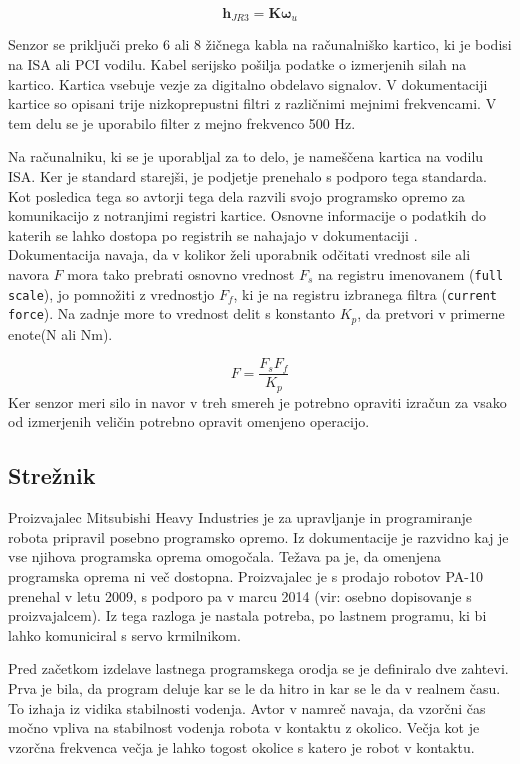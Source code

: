 \documentclass[a4paper]{article}
\begin{document}
\begin{equation}
\textbf{h}_{JR3} = \textbf{K} \mathbf{\omega}_u
\end{equation}



Senzor se priključi preko 6 ali 8 žičnega kabla na računalniško kartico, ki je bodisi na ISA ali PCI vodilu. Kabel serijsko pošilja podatke o izmerjenih silah na kartico. Kartica vsebuje vezje za digitalno obdelavo signalov. V dokumentaciji kartice \cite{jr3_doc_inst} so opisani trije nizkoprepustni filtri z različnimi mejnimi frekvencami. V tem delu se je uporabilo filter z mejno frekvenco 500 Hz.

Na računalniku, ki se je uporabljal za to delo, je nameščena kartica na vodilu ISA. Ker je standard starejši, je podjetje prenehalo s podporo tega standarda. Kot posledica tega so avtorji tega dela razvili svojo programsko opremo za komunikacijo z notranjimi registri kartice. Osnovne informacije o podatkih do katerih se lahko dostopa po registrih se nahajajo v dokumentaciji \cite{jr3_doc_inst}.
Dokumentacija navaja, da v kolikor želi uporabnik odčitati vrednost sile ali navora $F$ mora tako prebrati osnovno vrednost $F_s$ na registru imenovanem (\verb|full scale|), jo pomnožiti z vrednostjo $F_f$, ki je na registru izbranega filtra (\verb|current force|). Na zadnje more to vrednost delit s konstanto $K_p$, da pretvori v primerne enote(N ali Nm).

\begin{equation}\label{eq:force_filt}
F = \frac{F_s  F_f}{K_p}
\end{equation}
Ker senzor meri silo in navor v treh smereh je potrebno opraviti izračun za vsako od izmerjenih veličin potrebno opravit omenjeno operacijo.

\subsection{Strežnik} \label{sec:streznik}

Proizvajalec Mitsubishi Heavy Industries je za upravljanje in programiranje robota pripravil posebno programsko opremo. Iz dokumentacije je razvidno kaj je vse njihova programska oprema omogočala. Težava pa je, da omenjena programska oprema ni več dostopna. Proizvajalec je s prodajo robotov PA-10 prenehal v letu 2009, s podporo pa v marcu 2014 (vir: osebno dopisovanje s proizvajalcem). Iz tega razloga je nastala potreba, po lastnem programu, ki bi lahko komuniciral s servo krmilnikom.

Pred začetkom izdelave lastnega programskega orodja se je definiralo dve zahtevi. Prva je bila, da program deluje kar se le da hitro in kar se le da v realnem času. To izhaja iz vidika stabilnosti vodenja. Avtor v \cite{mihelj_hapt} namreč navaja, da vzorčni čas močno vpliva na stabilnost vodenja robota v kontaktu z okolico. Večja kot je vzorčna frekvenca večja je lahko togost okolice s katero je robot v kontaktu.
\end{document}
